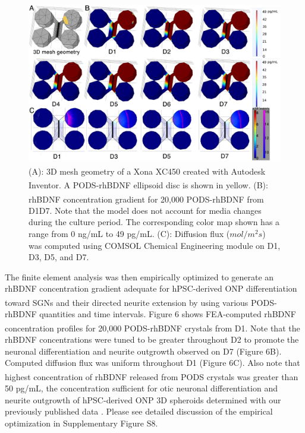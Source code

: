 \documentclass[review]{elsarticle}
\begin{document}
\begin{figure}
\begin{center}
	\includegraphics[width=13cm]{Fig_6.jpg}
\end{center}
\caption{(A): 3D mesh geometry of a Xona\textsuperscript{\texttrademark} XC450 created with Autodesk Inventor. A PODS\textsuperscript{\textregistered}-rhBDNF ellipsoid disc is shown in yellow. (B): rhBDNF concentration gradient for 20,000 PODS\textsuperscript{\textregistered}-rhBDNF from D1\textendash D7. Note that the model does not account for media changes during the culture period. The corresponding color map shown has a range from 0 ng/mL to 49 pg/mL. (C): Diffusion flux ($mol/m^{2}s$) was computed using COMSOL Chemical Engineering module on D1, D3, D5, and D7.}
\end{figure}

The finite element analysis was then empirically optimized to generate an rhBDNF concentration gradient adequate for hPSC-derived ONP differentiation toward SGNs and their directed neurite extension by using various PODS\textsuperscript{\textregistered}-rhBDNF quantities and time intervals. Figure 6 shows FEA-computed rhBDNF concentration profiles for 20,000 PODS\textsuperscript{\textregistered}-rhBDNF crystals from D1. Note that the rhBDNF concentrations were tuned to be greater throughout D2 to promote the neuronal differentiation and neurite outgrowth observed on D7 (Figure 6B). Computed diffusion flux was uniform throughout D1 (Figure 6C). Also note that highest concentration of rhBDNF released from PODS\textsuperscript{\textregistered} crystals was greater than 50 pg/mL, the concentration sufficient for otic neuronal differentiation and neurite outgrowth of hPSC-derived ONP 3D spheroids determined with our previously published data \cite{Chang2020}. Please see detailed discussion of the empirical optimization in Supplementary Figure S8. 
\end{document}

